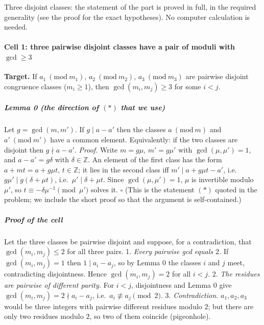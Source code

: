 
Three disjoint classes: the statement of the part is proved in full, in
the required generality (see the proof for the exact hypotheses). No
computer calculation is needed.


\paragraph{\texorpdfstring{Cell 1: three pairwise disjoint classes have
a pair of moduli with
\(\gcd\ge3\)}{Cell 1: three pairwise disjoint classes have a pair of moduli with \textbackslash gcd\textbackslash ge3}}\label{cell-1-three-pairwise-disjoint-classes-have-a-pair-of-moduli-with-gcdge3}

\textbf{Target.} If \(a_1\ (\mathrm{mod}\ m_1)\),
\(a_2\ (\mathrm{mod}\ m_2)\), \(a_3\ (\mathrm{mod}\ m_3)\) are pairwise
disjoint congruence classes (\(m_i\ge1\)), then \(\gcd(m_i,m_j)\ge3\)
for some \(i<j\).

\subparagraph{\texorpdfstring{Lemma 0 (the direction of \((*)\) that we
use)}{Lemma 0 (the direction of (*) that we use)}}\label{lemma-0-the-direction-of-that-we-use}

Let \(g=\gcd(m,m')\). If \(g\mid a-a'\) then the classes
\(a\ (\mathrm{mod}\ m)\) and \(a'\ (\mathrm{mod}\ m')\) have a common
element. Equivalently: if the two classes are disjoint then
\(g\nmid a-a'\). \emph{Proof.} Write \(m=g\mu\), \(m'=g\mu'\) with
\(\gcd(\mu,\mu')=1\), and \(a-a'=g\delta\) with \(\delta\in\mathbb Z\).
An element of the first class has the form \(a+mt=a+g\mu t\),
\(t\in\mathbb Z\); it lies in the second class iff
\(m'\mid a+g\mu t-a'\), i.e.~\(g\mu'\mid g(\delta+\mu t)\),
i.e.~\(\mu'\mid\delta+\mu t\). Since \(\gcd(\mu,\mu')=1\), \(\mu\) is
invertible modulo \(\mu'\), so \(t\equiv-\delta\mu^{-1}\pmod{\mu'}\)
solves it. \(\square\) (This is the statement \((*)\) quoted in the
problem; we include the short proof so that the argument is
self-contained.)

\subparagraph{Proof of the cell}\label{proof-of-the-cell}

Let the three classes be pairwise disjoint and suppose, for a
contradiction, that \(\gcd(m_i,m_j)\le2\) for all three pairs. 1.
\emph{Every pairwise gcd equals \(2\).} If \(\gcd(m_i,m_j)=1\) then
\(1\mid a_i-a_j\), so by Lemma 0 the classes \(i\) and \(j\) meet,
contradicting disjointness. Hence \(\gcd(m_i,m_j)=2\) for all \(i<j\).
2. \emph{The residues are pairwise of different parity.} For \(i<j\),
disjointness and Lemma 0 give \(\gcd(m_i,m_j)=2\nmid a_i-a_j\),
i.e.~\(a_i\not\equiv a_j\pmod 2\). 3. \emph{Contradiction.}
\(a_1,a_2,a_3\) would be three integers with pairwise different residues
modulo \(2\); but there are only two residues modulo \(2\), so two of
them coincide (pigeonhole).

